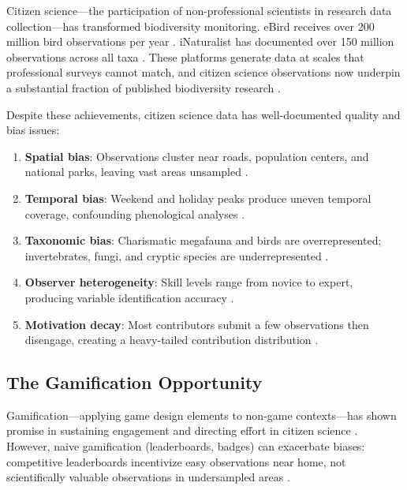 \documentclass[11pt,a4paper]{article}
\begin{document}
Citizen science---the participation of non-professional scientists in
research data collection---has transformed biodiversity monitoring.
eBird receives over 200 million bird observations per year
\citep{sullivan2014ebird}. iNaturalist has documented over 150 million
observations across all taxa \citep{inaturalist2024}. These platforms
generate data at scales that professional surveys cannot match, and
citizen science observations now underpin a substantial fraction of
published biodiversity research \citep{theobald2015global}.

Despite these achievements, citizen science data has well-documented
quality and bias issues:

\begin{enumerate}[label=(\roman*)]
  \item \textbf{Spatial bias}: Observations cluster near roads,
    population centers, and national parks, leaving vast areas
    unsampled \citep{boakes2010distorted}.
  \item \textbf{Temporal bias}: Weekend and holiday peaks produce
    uneven temporal coverage, confounding phenological analyses
    \citep{courter2013weekend}.
  \item \textbf{Taxonomic bias}: Charismatic megafauna and birds are
    overrepresented; invertebrates, fungi, and cryptic species are
    underrepresented \citep{troudet2017taxonomic}.
  \item \textbf{Observer heterogeneity}: Skill levels range from novice
    to expert, producing variable identification accuracy
    \citep{kelling2015can}.
  \item \textbf{Motivation decay}: Most contributors submit a few
    observations then disengage, creating a heavy-tailed contribution
    distribution \citep{sauermann2015crowd}.
\end{enumerate}

\subsection{The Gamification Opportunity}

Gamification---applying game design elements to non-game contexts---has
shown promise in sustaining engagement and directing effort in citizen
science \citep{bowser2013gamifying, eveleigh2014designing}. However,
naive gamification (leaderboards, badges) can exacerbate biases:
competitive leaderboards incentivize easy observations near home, not
scientifically valuable observations in undersampled areas
\citep{crowston2020citizen}.
\end{document}
